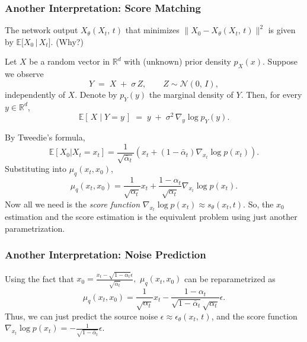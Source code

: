 \subsubsection*{Another Interpretation: Score Matching}
The network output \(X_{\theta}(X_{t},\,t)\) that minimizes
\(\bigl\lVert X_{0} - X_{\theta}(X_{t},\,t)\bigr\rVert^{2}\) 
is given by $\mathbb{E}\bigl[X_{0}\,|\,X_{t}\bigr]$. (Why?)
\begin{lemma}
Let \(X\) be a random vector in \(\mathbb{R}^d\) with (unknown) prior density \(p_X(x)\).  Suppose we observe
\[
Y \;=\; X \;+\; \sigma\,Z,
\qquad
Z \sim \mathcal{N}(0,\,I),
\]
independently of \(X\). Denote by \(p_Y(y)\) the marginal density of \(Y\).  Then, for every \(y\in\mathbb{R}^d\),
\[
\mathbb{E}[\,X \mid Y=y\,]
\;=\;
y \;+\; \sigma^{2}\,\nabla_{y}\log p_Y(y).
\]
\end{lemma}
\noindent By Tweedie's formula,
\[
\mathbb{E}[X_0|X_t=x_t]=\frac{1}{\sqrt{\bar{\alpha}_t}}(x_t+(1-\bar{\alpha}_t)\nabla_{x_t}\log p(x_t)).
\]
Substituting into $\mu_q(x_{t}, x_{0})$, 
\[{\mu}_q(x_t, x_0)=\frac{1}{\sqrt{\alpha_t}}x_t+\frac{1-\alpha_t}{\sqrt{\alpha_t}}\nabla_{x_t}\log p(x_t).\]
Now all we need is the \emph{score function} $\nabla_{x_t}\log p(x_t)\approx s_{\theta}(x_t,t)$. So, the $x_0$ estimation and the score estimation is the equivalent problem using just another parametrization.

\subsubsection*{Another Interpretation: Noise Prediction}
Using the fact that $x_0=\frac{x_t-\sqrt{1-\bar{\alpha}_t}\epsilon}{\sqrt{\bar{\alpha}_t}},\,\, \mu_q(x_{t}, x_{0})$ can be reparametrized as 
\[\mu_q(x_t, x_0)=\frac{1}{\sqrt{\alpha_t}}x_t-\frac{1-\alpha_t}{\sqrt{1-\bar{\alpha}_t}\sqrt{\alpha_t}}\epsilon.\] Thus, we can just predict the source noise $\epsilon \approx \epsilon_{\theta}(x_t,\,t)$, and the score function $\nabla_{x_t}\log p(x_t)=-\frac{1}{\sqrt{1-\bar{\alpha}_t}}\epsilon.$








